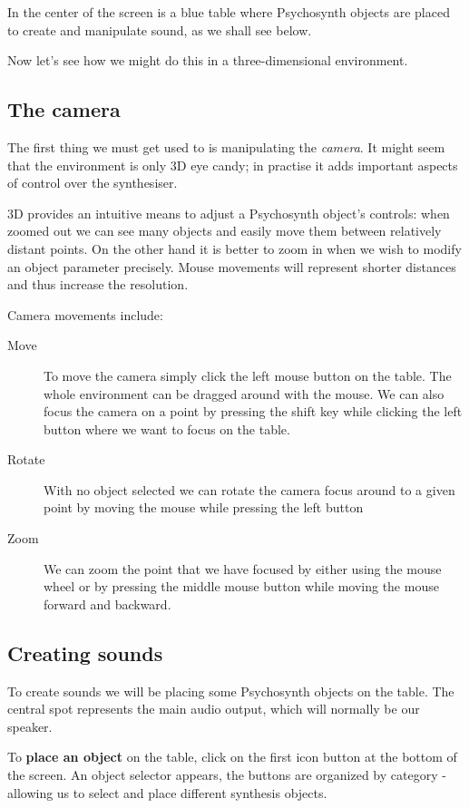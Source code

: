 In the center of the screen is a blue table where Psychosynth objects
are placed to create and manipulate sound, as we shall see below.

Now let's see how we might do this in a three-dimensional environment.

\subsection{The camera}

The first thing we must get used to is manipulating the
\emph{camera}. It might seem that the environment is only 3D eye
candy; in practise it adds important aspects of control over the
synthesiser.

3D provides an intuitive means to adjust a Psychosynth object's
controls: when zoomed out we can see many objects and easily move them
between relatively distant points. On the other hand it is better to
zoom in when we wish to modify an object parameter precisely. Mouse
movements will represent shorter distances and thus increase the
resolution.

Camera movements include:

\begin{description}
\item[Move] To move the camera simply click the left mouse button on
  the table. The whole environment can be dragged around with the
  mouse. We can also focus the camera on a point by pressing the shift
  key while clicking the left button where we want to focus on the
  table.
\item[Rotate] With no object selected we can rotate the camera focus
  around to a given point by moving the mouse while pressing the left
  button
\item[Zoom] We can zoom the point that we have focused by either using
  the mouse wheel or by pressing the middle mouse button while moving
  the mouse forward and backward.
\end{description}

\subsection{Creating sounds}

To create sounds we will be placing some Psychosynth objects on the
table. The central spot represents the main audio output, which will
normally be our speaker.

To \textbf{place an object} on the table, click on the first icon
button at the bottom of the screen. An object selector appears, the
buttons are organized by category - allowing us to select and place
different synthesis objects.


